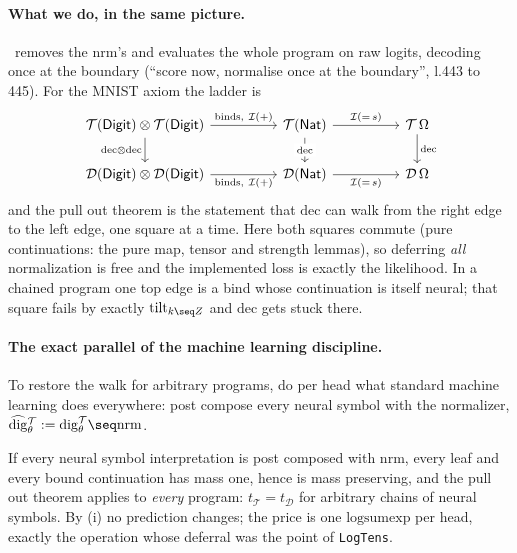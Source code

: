 \documentclass[anon]{../../journal-templates/NeSy26/nesy2026} %
\begin{document}
\begin{description}
\paragraph{What we do, in the same picture.} \nesycattorch\ removes the
$\mathrm{nrm}$'s and evaluates the whole program on raw logits, decoding
once at the boundary (``score now, normalise once at the boundary'',
l.443 to 445). For the MNIST axiom the ladder is
\[\begin{tikzcd}[ampersand replacement=\&, column sep=2.4em]
  {\mathcal T(\mathsf{Digit}) \otimes \mathcal T(\mathsf{Digit})} \&\&
  {\mathcal T(\mathsf{Nat})} \&\& {\mathcal T\,\Omega} \\
  {\mathcal D(\mathsf{Digit}) \otimes \mathcal D(\mathsf{Digit})} \&\&
  {\mathcal D(\mathsf{Nat})} \&\& {\mathcal D\,\Omega}
  \arrow["{\text{binds},\ \mathcal I(+)}", from=1-1, to=1-3]
  \arrow["{\mathcal I({=}\,s)}", from=1-3, to=1-5]
  \arrow["{\mathrm{dec} \otimes \mathrm{dec}}"', from=1-1, to=2-1]
  \arrow["{\mathrm{dec}}"{description}, from=1-3, to=2-3]
  \arrow["{\mathrm{dec}}", from=1-5, to=2-5]
  \arrow["{\text{binds},\ \mathcal I(+)}"', from=2-1, to=2-3]
  \arrow["{\mathcal I({=}\,s)}"', from=2-3, to=2-5]
\end{tikzcd}\]
and the pull out theorem is the statement that $\mathrm{dec}$ can walk
from the right edge to the left edge, one square at a time. Here both
squares commute (pure continuations: the pure map, tensor and strength
lemmas), so deferring \emph{all} normalization is free and the
implemented loss is exactly the likelihood. In a chained program one top
edge is a bind whose continuation is itself neural; that square fails by
exactly $\mathrm{tilt}_{k \seq Z}$ and $\mathrm{dec}$ gets stuck there.

\paragraph{The exact parallel of the machine learning discipline.} To
restore the walk for arbitrary programs, do per head what standard
machine learning does everywhere: post compose every neural symbol with
the normalizer,
$\widehat{\mathrm{dig}}{}^{\mathcal T}_\theta
 := \mathrm{dig}^{\mathcal T}_\theta \seq \mathrm{nrm}$.

\begin{corollary}
If every neural symbol interpretation is post composed with
$\mathrm{nrm}$, every leaf and every bound continuation has mass one,
hence is mass preserving, and the pull out theorem applies to
\emph{every} program: $t_{\mathcal T} = t_{\mathcal D}$ for arbitrary
chains of neural symbols. By (i) no prediction changes; the price is one
$\mathrm{logsumexp}$ per head, exactly the operation whose deferral was
the point of \texttt{LogTens}.
\end{corollary}


\end{description}
\end{document}
